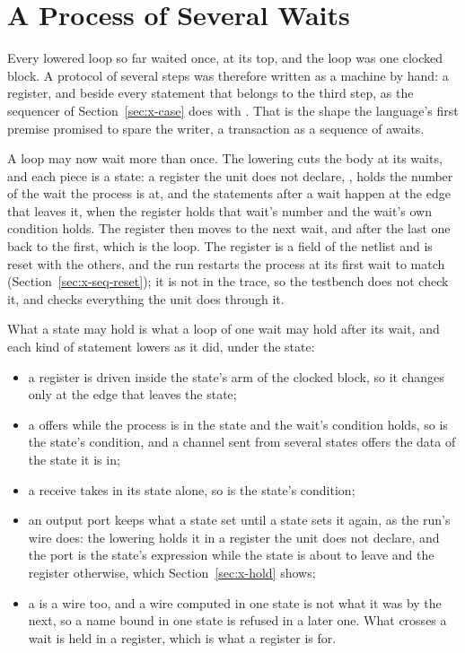 \section{A Process of Several Waits}
\label{sec:x-seq}

Every lowered loop so far waited once, at its top, and the loop was
one clocked block. A protocol of several steps was therefore written
as a machine by hand: a  register, and 
beside every statement that belongs to the third step, as the
sequencer of Section~\ref{sec:x-case} does with . That
is the shape the language's first premise promised to spare the
writer, a transaction as a sequence of awaits.

A loop may now wait more than once. The lowering cuts the body at
its waits, and each piece is a state: a register the unit does not
declare, , holds the number of the wait the process is
at, and the statements after a wait happen at the edge that leaves
it, when the register holds that wait's number and the wait's own
condition holds. The register then moves to the next wait, and after
the last one back to the first, which is the loop. The register is a
field of the netlist and is reset with the others, and the run
restarts the process at its first wait to match
(Section~\ref{sec:x-seq-reset}); it is not in the
trace, so the testbench does not check it, and checks everything the
unit does through it.

What a state may hold is what a loop of one wait may hold after its
wait, and each kind of statement lowers as it did, under the state:

\begin{itemize}
  \item a register is driven inside the state's arm of the clocked
        block, so it changes only at the edge that leaves the state;
  \item a  offers while the process is in the state and the
        wait's condition holds, so  is the state's
        condition, and a channel sent from several states offers the
        data of the state it is in;
  \item a receive takes in its state alone, so  is the
        state's condition;
  \item an output port keeps what a state set until a state sets it
        again, as the run's wire does: the lowering holds it in a
        register the unit does not declare, and the port is the
        state's expression while the state is about to leave and the
        register otherwise, which Section~\ref{sec:x-hold} shows;
  \item a  is a wire too, and a wire computed in one state is
        not what it was by the next, so a name bound in one state is
        refused in a later one. What crosses a wait is held in a
        register, which is what a register is for.
\end{itemize}

